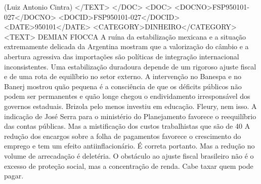 (Luiz Antonio Cintra)
</TEXT>
</DOC>
<DOC>
<DOCNO>FSP950101-027</DOCNO>
<DOCID>FSP950101-027</DOCID>
<DATE>950101</DATE>
<CATEGORY>DINHEIRO</CATEGORY>
<TEXT>
DEMIAN FIOCCA 
A ruína da estabilização mexicana e a situação extremamente delicada da Argentina mostram que a valorização do câmbio e a abertura agressiva das importações são políticas de integração internacional inconsistentes. Uma estabilização duradoura depende de um rigoroso ajuste fiscal e de uma rota de equilíbrio no setor externo.
A intervenção no Banespa e no Banerj mostrou quão pequena é a consciência de que os déficits públicos não podem ser permanentes e quão longe chegou o endividamento irresponsável dos governos estaduais. Brizola pelo menos investiu em educação. Fleury, nem isso.
A indicação de José Serra para o ministério do Planejamento favorece o reequilíbrio das contas públicas. Mas a mistificação dos custos trabalhistas que são de 40%
A redução dos encargos sobre a folha de pagamentos favorece o crescimento do emprego e tem um efeito antiinflacionário. É correta portanto. Mas a redução no volume de arrecadação é deletéria. O obstáculo ao ajuste fiscal brasileiro não é o excesso de proteção social, mas a concentração de renda. Cabe taxar quem pode pagar.

